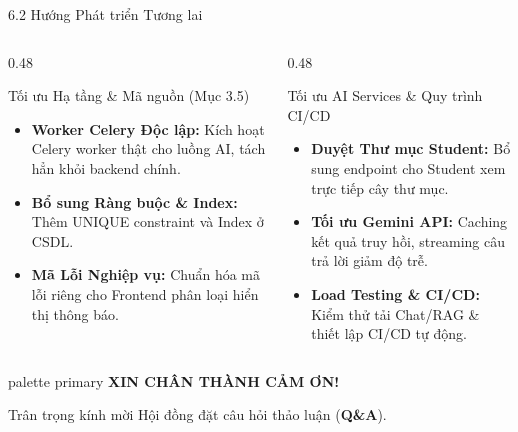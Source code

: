 \documentclass[10pt, aspectratio=169]{beamer}
\begin{document}
\begin{frame}{6.2 Hướng Phát triển Tương lai}
    \begin{columns}[T]
        \begin{column}{0.48\textwidth}
            \begin{block}{Tối ưu Hạ tầng \& Mã nguồn (Mục 3.5)}
                \begin{itemize}
                    \item \textbf{Worker Celery Độc lập:} Kích hoạt Celery worker thật cho luồng AI, tách hẳn khỏi backend chính.
                    \item \textbf{Bổ sung Ràng buộc \& Index:} Thêm UNIQUE constraint và Index ở CSDL.
                    \item \textbf{Mã Lỗi Nghiệp vụ:} Chuẩn hóa mã lỗi riêng cho Frontend phân loại hiển thị thông báo.
                \end{itemize}
            \end{block}
        \end{column}

        \begin{column}{0.48\textwidth}
            \begin{exampleblock}{Tối ưu AI Services \& Quy trình CI/CD}
                \begin{itemize}
                    \item \textbf{Duyệt Thư mục Student:} Bổ sung endpoint cho Student xem trực tiếp cây thư mục.
                    \item \textbf{Tối ưu Gemini API:} Caching kết quả truy hồi, streaming câu trả lời giảm độ trễ.
                    \item \textbf{Load Testing \& CI/CD:} Kiểm thử tải Chat/RAG \& thiết lập CI/CD tự động.
                \end{itemize}
            \end{exampleblock}
        \end{column}
    \end{columns}
\end{frame}

\begin{frame}[plain]
    \vfill
    \begin{center}
        \begin{beamercolorbox}[sep=12pt,center,rounded=true,shadow=true]{palette primary}
            {\Huge \textbf{XIN CHÂN THÀNH CẢM ƠN!}}
        \end{beamercolorbox}
        
        \vspace{0.6cm}
        {\Large Trân trọng kính mời Hội đồng đặt câu hỏi thảo luận (\textbf{Q\&A}).}
    \end{center}
    \vfill
\end{frame}
\end{document}
